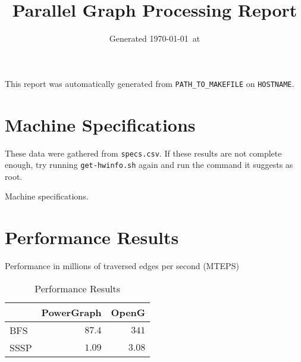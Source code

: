 \documentclass[11pt]{article}
\begin{document}
\title{Parallel Graph Processing Report\vspace{-2em}}
\author{}
\date{Generated \today\ at \currenttime}
\maketitle

This report was automatically generated from \verb|PATH_TO_MAKEFILE| on \verb|HOSTNAME|.

\section{Machine Specifications}
These data were gathered from \verb|specs.csv|. If these results are not complete enough, try running \verb|get-hwinfo.sh| again and run the command it suggests as root.

\begin{table}[htb]
	\centering
	\caption{Machine specifications.}
	\label{tab:specs}
\end{table}

\section{Performance Results}
Performance in millions of traversed edges per second (MTEPS)

\begin{table}[htb]
	\centering
	\begin{tabular}{l|r|r|}
	 & PowerGraph & OpenG \\ \hline
	BFS & $87.4$ & $341$ \\ \hline
	SSSP & $1.09$ & $3.08$ \\ \hline
	\end{tabular}
	\caption{Performance Results}
	\label{tab:perf}
\end{table}
\end{document}
